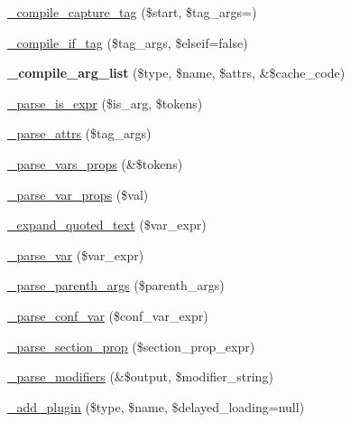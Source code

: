 \begin{DoxyCompactItemize}
\item 
\mbox{\hyperlink{class_smarty___compiler_aec50d967563cb6ed4faa78357735bf59}{\+\_\+compile\+\_\+capture\+\_\+tag}} (\$start, \$tag\+\_\+args=\textquotesingle{}\textquotesingle{})
\item 
\mbox{\hyperlink{class_smarty___compiler_a58d511ec4be2cdd98a9cd9576816fa21}{\+\_\+compile\+\_\+if\+\_\+tag}} (\$tag\+\_\+args, \$elseif=false)
\item 
\mbox{\label{class_smarty___compiler_aacb2bf6867e0434961e86130d8ee466e}} 
{\bfseries \+\_\+compile\+\_\+arg\+\_\+list} (\$type, \$name, \$attrs, \&\$cache\+\_\+code)
\item 
\mbox{\hyperlink{class_smarty___compiler_aaf4aec862e7a94d4217382dceae72b50}{\+\_\+parse\+\_\+is\+\_\+expr}} (\$is\+\_\+arg, \$tokens)
\item 
\mbox{\hyperlink{class_smarty___compiler_a5706e11e1bec434a07ced48e1462507c}{\+\_\+parse\+\_\+attrs}} (\$tag\+\_\+args)
\item 
\mbox{\hyperlink{class_smarty___compiler_a0e01da79d898117be860ab893d15b477}{\+\_\+parse\+\_\+vars\+\_\+props}} (\&\$tokens)
\item 
\mbox{\hyperlink{class_smarty___compiler_ac289c6c7cacaab608f81e68976acca77}{\+\_\+parse\+\_\+var\+\_\+props}} (\$val)
\item 
\mbox{\hyperlink{class_smarty___compiler_aba11f398aa3e57fbf119bb1d718e854c}{\+\_\+expand\+\_\+quoted\+\_\+text}} (\$var\+\_\+expr)
\item 
\mbox{\hyperlink{class_smarty___compiler_a2dcafc2754e3bdbda348d4b728d16a0e}{\+\_\+parse\+\_\+var}} (\$var\+\_\+expr)
\item 
\mbox{\hyperlink{class_smarty___compiler_aa33dedec468797a2311562fdd976c870}{\+\_\+parse\+\_\+parenth\+\_\+args}} (\$parenth\+\_\+args)
\item 
\mbox{\hyperlink{class_smarty___compiler_a5b6479977bec73b8ae0732c2b4f47d16}{\+\_\+parse\+\_\+conf\+\_\+var}} (\$conf\+\_\+var\+\_\+expr)
\item 
\mbox{\hyperlink{class_smarty___compiler_af3c3473a68eab6b7d9a08f7dd2357469}{\+\_\+parse\+\_\+section\+\_\+prop}} (\$section\+\_\+prop\+\_\+expr)
\item 
\mbox{\hyperlink{class_smarty___compiler_a5f39bfb73d59e9ec871c9c558c3c5d86}{\+\_\+parse\+\_\+modifiers}} (\&\$output, \$modifier\+\_\+string)
\item 
\mbox{\hyperlink{class_smarty___compiler_a8dc53786beac8f4ca7c8d86cf1bbbd95}{\+\_\+add\+\_\+plugin}} (\$type, \$name, \$delayed\+\_\+loading=null)

\end{DoxyCompactItemize}
